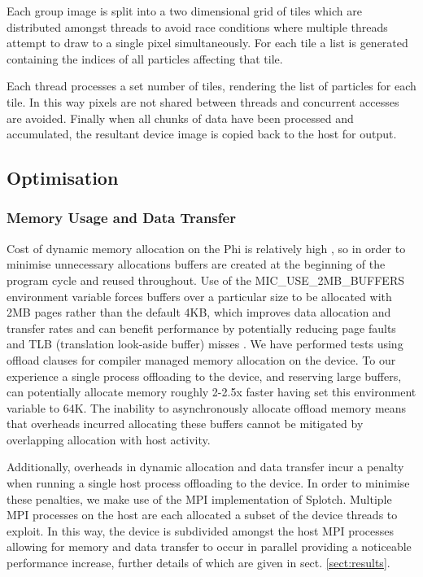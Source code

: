\documentclass[runningheads,a4paper]{llncs}
\begin{document}
Each group image is split into a two dimensional grid of tiles which are distributed amongst threads to avoid race 
conditions where multiple threads attempt to draw to a single pixel simultaneously. For each tile a list is generated 
containing the indices of all particles affecting that tile.

Each thread processes a set number of tiles, rendering the list of particles for each tile. 
In this way pixels are not shared between threads and concurrent accesses are avoided. Finally when all 
chunks of data have been processed and accumulated, the resultant device image is copied back to the host for output. 

\subsection{Optimisation}
\label{sect:micoptimisation}

\subsubsection{Memory Usage and Data Transfer}
\label{sect:memusage}

Cost of dynamic memory allocation on the Phi is relatively high \cite{mem_alloc}, so in order to minimise unnecessary allocations 
buffers are created at the beginning of the program cycle and reused throughout. Use of the MIC\_USE\_2MB\_BUFFERS 
environment variable forces buffers over a particular size to be allocated with 2MB pages rather than the default 4KB, 
which improves data allocation and transfer rates and can benefit performance by potentially reducing page 
faults and TLB (translation look-aside buffer) misses \cite{env_var_buf}. We have performed tests using offload clauses for compiler 
managed memory allocation on the device. To our experience a single process offloading to the device, and reserving large buffers, can
potentially allocate memory roughly 2-2.5x faster having set this environment variable to 64K. The inability to asynchronously 
allocate offload memory means that overheads incurred allocating these buffers cannot be mitigated by overlapping allocation with host activity.

Additionally, overheads in dynamic allocation and data transfer incur a penalty when running a single host process 
offloading to the device. In order to minimise these penalties, we make use of the MPI implementation of Splotch. 
Multiple MPI processes on the host are each allocated a subset of the device threads to exploit. In this way, the device is 
subdivided amongst the host MPI processes allowing for memory and data transfer to occur in parallel providing a noticeable 
performance increase, further details of which are given in sect. \ref{sect:results}.
\end{document}

